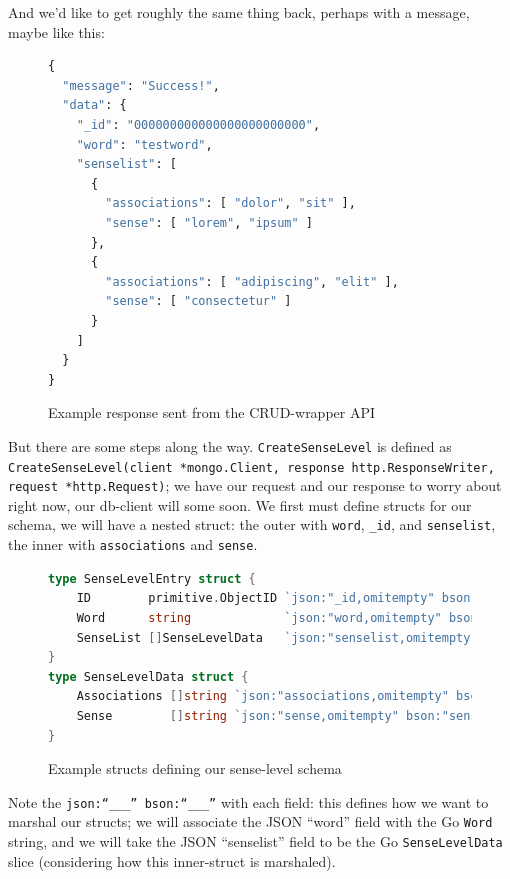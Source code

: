 \documentclass[11pt, twoside, reqno]{book}
\begin{document}
And we'd like to get roughly the same thing back, perhaps with a message, maybe like this:
\pagebreak

\vspace{12pt}
\begin{figure}[h!]
  \footnotesize{
\begin{lstlisting}[language=Python]
{
  "message": "Success!",
  "data": {
    "_id": "000000000000000000000000",
    "word": "testword",
    "senselist": [
      {
        "associations": [ "dolor", "sit" ],
        "sense": [ "lorem", "ipsum" ]
      },
      {
        "associations": [ "adipiscing", "elit" ],
        "sense": [ "consectetur" ]
      }
    ]
  }
}
\end{lstlisting}}
\caption{Example response sent from the CRUD-wrapper API}
\end{figure}

But there are some steps along the way. \texttt{CreateSenseLevel} is defined as \texttt{CreateSenseLevel(client *mongo.Client, response http.ResponseWriter, request *http.Request)}; we have our request and our response to worry about right now, our db-client will some soon. We first must define structs for our schema, we will have a nested struct: the outer with \texttt{word}, \texttt{\_id}, and \texttt{senselist}, the inner with \texttt{associations} and \texttt{sense}.

\vspace{12pt}
\begin{figure}[h!]
  \footnotesize{
\begin{lstlisting}[language=Go]
type SenseLevelEntry struct {
	ID        primitive.ObjectID `json:"_id,omitempty" bson:"_id,omitempty"`
	Word      string             `json:"word,omitempty" bson:"word,omitempty"`
	SenseList []SenseLevelData   `json:"senselist,omitempty" bson:"senselist,omitempty"`
}
type SenseLevelData struct {
	Associations []string `json:"associations,omitempty" bson:"associations,omitempty"`
	Sense        []string `json:"sense,omitempty" bson:"sense,omitempty"`
}
\end{lstlisting}}
\caption{Example structs defining our sense-level schema}
\end{figure}

Note the \texttt{json:``\_\_\_'' bson:``\_\_\_''} with each field: this defines how we want to marshal our structs; we will associate the JSON ``word'' field with the Go \texttt{Word} string, and we will take the JSON ``senselist'' field to be the Go \texttt{SenseLevelData} slice (considering how this inner-struct is marshaled).
\end{document}
